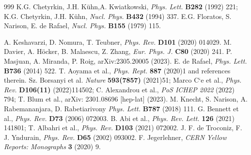 \begin{thebibliography}{999}
 K.G. Chetyrkin, J.H. K\"uhn,A. Kwiatkowski, {\it Phys. Lett.} {\bf B282} (1992) 221; K.G. Chetyrkin, J.H. K\"uhn, {\it Nucl. Phys.} {\bf B432} (1994) 337.
E.G. Floratos, S. Narison, E. de Rafael, {\it Nucl. Phys.} {\bf B155} (1979) 115.

A. Keshavarzi, D. Nomura, T. Teubner, {\it Phys. Rev.} {\bf D101} (2020) 014029.
 M. Davier, A. H\"ocker, B. Malaescu,  Z. Zhang, {\it Eur. Phys. J.} {\bf C80} (2020) 241.
  P. Masjuan, A. Miranda, P. Roig, arXiv:2305.20005 (2023). 
  E. de Rafael, {\it Phys. Lett.} {\bf B736} (2014) 522.
 T. Aoyama et al., {\it  Phys. Rept.} {\bf 887} (2020)1 and references therein.
 Sz. Borsanyi et al. {\it  Nature} {\bf 593(7857)} (2021)51;  Marco C`e et al.,
{\it  Phys. Rev.} {\bf D106(11)} (2022)114502; C. Alexandrou et al., {\it PoS ICHEP 2022} (2022) 794; T. Blum et al., arXiv:  2301.08696 [hep-lat] (2023).
  M. Knecht, S. Narison, A. Rabemananjara, D. Rabetiarivony
 {\it Phys. Lett.} {\bf B787} (2018) 111.
  G. Bennett et al., {\it Phys. Rev.} {\bf D73} (2006) 072003.
    B. Abi et al., {\it Phys. Rev. Lett.} {\bf 126} (2021) 141801;  T. Albahri et al., {\it Phys. Rev.} {\bf  D103} (2021) 072002.
J. F. de Troconiz, F. J. Yndurain, {\it Phys. Rev.} {\bf D65} (2002) 093002.
 F. Jegerlehner, {\it CERN Yellow Reports: Monographs} {\bf 3} (2020) 9.
\end{thebibliography}



